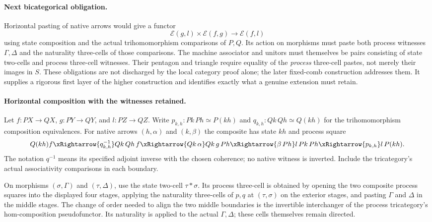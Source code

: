 \documentclass{article}
\begin{document}
\paragraph{Next bicategorical obligation.} Horizontal pasting of native arrows would give a functor
\[
 \mathcal E(g,l)\times\mathcal E(f,g)\longrightarrow\mathcal E(f,l)
\]
using state composition and the actual trihomomorphism comparisons of $P,Q$. Its action on morphisms must paste both process witnesses $\Gamma,\Delta$ and the naturality three-cells of those comparisons. The machine associator and unitors must themselves be pairs consisting of state two-cells and process three-cell witnesses. Their pentagon and triangle require equality of the \emph{process} three-cell pastes, not merely their images in $S$. These obligations are not discharged by the local category proof alone; the later fixed-comb construction addresses them. It supplies a rigorous first layer of the higher construction and identifies exactly what a genuine extension must retain.
\paragraph{Horizontal composition with the witnesses retained.} Let $f:PX\to QX$, $g:PY\to QY$, and $l:PZ\to QZ$. Write $p_{k,h}:Pk\,Ph\simeq P(kh)$ and $q_{k,h}:Qk\,Qh\simeq Q(kh)$ for the trihomomorphism composition equivalences. For native arrows $(h,\alpha)$ and $(k,\beta)$ the composite has state $kh$ and process square
\[
 Q(kh)f\xRightarrow{q_{k,h}^{-1}}Qk\,Qh\,f
 \xRightarrow{Qk\,\alpha}Qk\,g\,Ph
 \xRightarrow{\beta\,Ph}l\,Pk\,Ph
 \xRightarrow{p_{k,h}}l\,P(kh).
\]
The notation $q^{-1}$ means its specified adjoint inverse with the chosen coherence; no native witness is inverted. Include the tricategory's actual associativity comparisons in each boundary.

On morphisms $(\sigma,\Gamma)$ and $(\tau,\Delta)$, use the state two-cell $\tau\ast\sigma$. Its process three-cell is obtained by opening the two composite process squares into the displayed four stages, applying the naturality three-cells of $p,q$ at $(\tau,\sigma)$ on the exterior stages, and pasting $\Gamma$ and $\Delta$ in the middle stages. The change of order needed to align the two middle boundaries is the invertible interchanger of the process tricategory's hom-composition pseudofunctor. Its naturality is applied to the actual $\Gamma,\Delta$; these cells themselves remain directed.
\end{document}
